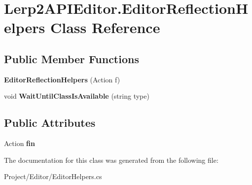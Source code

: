 \hypertarget{class_lerp2_a_p_i_editor_1_1_editor_reflection_helpers}{}\section{Lerp2\+A\+P\+I\+Editor.\+Editor\+Reflection\+Helpers Class Reference}
\label{class_lerp2_a_p_i_editor_1_1_editor_reflection_helpers}
\subsection*{Public Member Functions}
\begin{DoxyCompactItemize}
\item 
\mbox{\label{class_lerp2_a_p_i_editor_1_1_editor_reflection_helpers_a7510cf6dfb74d26787c51c52d1726224}} 
{\bfseries Editor\+Reflection\+Helpers} (Action f)
\item 
\mbox{\label{class_lerp2_a_p_i_editor_1_1_editor_reflection_helpers_a6b4b4c039fdf60d1320c93bc1bfa4b7b}} 
void {\bfseries Wait\+Until\+Class\+Is\+Available} (string type)
\end{DoxyCompactItemize}
\subsection*{Public Attributes}
\begin{DoxyCompactItemize}
\item 
\mbox{\label{class_lerp2_a_p_i_editor_1_1_editor_reflection_helpers_ae242808119aa1d686b7864e255e44b4f}} 
Action {\bfseries fin}
\end{DoxyCompactItemize}


The documentation for this class was generated from the following file\+:\begin{DoxyCompactItemize}
\item 
Project/\+Editor/Editor\+Helpers.\+cs\end{DoxyCompactItemize}
